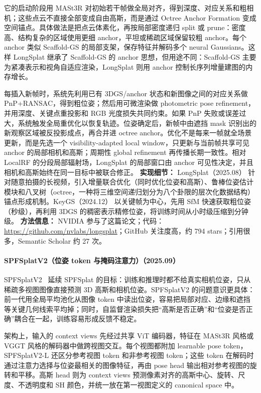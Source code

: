 它的启动阶段用 MASt3R 对初始若干帧做全局对齐，得到深度、对应关系和粗相机；这些点云不直接全部变成自由高斯，而是通过 Octree Anchor Formation 变成空间锚点。具体做法是把点云体素化，再按局部密度递归 split 或 prune：密度高、结构复杂的区域使用更细 anchor，平坦或稀疏区域保留较粗 anchor。每个 anchor 类似 Scaffold-GS 的局部支架，保存特征并解码多个 neural Gaussians。这样 LongSplat 继承了 Scaffold-GS 的 anchor 思想，但用途不同：Scaffold-GS 主要为紧凑表示和视角自适应渲染，LongSplat 则用 anchor 控制长序列增量建图的内存增长。

每插入新帧时，系统先利用已有 3DGS/anchor 状态和新图像之间的对应关系做 PnP+RANSAC，得到粗位姿；然后用可微渲染做 photometric pose refinement，并用深度、关键点重投影和 RGB 光度损失共同约束。如果 PnP 失败或误差过大，系统触发全局重优化以恢复轨迹。位姿确定后，新帧中由遮挡 mask 识别出的新观察区域被反投影成点，再合并进 octree anchor。优化不是每来一帧就全场景更新，而是先选一个 visibility-adapted local window，只更新与当前帧共享可见 anchor 的局部相机和高斯；周期性 global refinement 再传播长期一致性。相对 LocalRF 的分段局部辐射场，LongSplat 的局部窗口由 anchor 可见性决定，并且相机和高斯始终在同一目标中被联合修正。
\textbf{实现细节：} LongSplat（2025.08） 针对随意拍摄的长视频，引入增量联合优化（同时优化位姿和高斯）、鲁棒位姿估计模块和八叉树（octree，一种将三维空间递归划分为八个卦限的层次化数据结构）锚点形成机制。KeyGS（2024.12） 以关键帧为中心，先用 SfM 快速获取粗位姿（秒级），再利用 3DGS 的稠密表示精修位姿，将训练时间从小时级压缩到分钟级。
\textbf{方法信息：} NVIDIA 参与了这篇论文；代码：\url{https://github.com/nvlabs/longsplat}；GitHub 关注度高，约 794 stars；引用很多，Semantic Scholar 约 27 次。



\paragraph{SPFSplatV2（位姿 token 与掩码注意力）（2025.09）}
SPFSplatV2~\cite{2509_17246} 延续 SPFSplat 的目标：训练和推理时都不给真实相机位姿，只从稀疏多视图图像直接预测 3D 高斯和相机位姿。SPFSplatV2 的问题意识更具体：前一代用全局平均池化从图像 token 中读出位姿，容易把局部对应、边缘和遮挡等关键几何线索平均掉；同时，自监督渲染损失把“高斯是否正确”和“位姿是否正确”耦合在一起，训练容易形成反馈不稳定。

架构上，输入的 context views 先经过共享 ViT 编码器，特征在 MASt3R 风格或 VGGT 风格的解码器中做跨视图交互。每个视图都附加 learnable pose token，SPFSplatV2-L 还区分参考视图 token 和非参考视图 token；这些 token 在解码时通过注意力选择与位姿最相关的图像特征，再由 pose head 输出相对参考视图的旋转和平移。高斯 head 则为 context views 预测像素对齐的高斯中心、旋转、尺度、不透明度和 SH 颜色，并统一放在第一视图定义的 canonical space 中。

